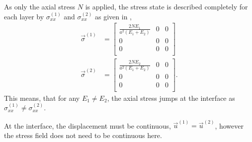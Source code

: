 \begin{derivation}
    As only the axial stress $N$ is applied, the stress state is described completely for each layer by $\sigma_{x x}^{(1)}$ and $\sigma_{x x}^{(2)}$ as given in ,
    \begin{align*}
      \Vec{\sigma}^{(1)} &= \begin{bmatrix}
        \frac{2NE_1}{a^2 \left( E_1 + E_2 \right)} & 0 & 0\\
      0 & 0 & 0\\
      0 & 0 & 0\\
      \end{bmatrix} \\
        \Vec{\sigma}^{(2)} &= \begin{bmatrix}
          \frac{2N E_2}{a^2 \left( E_1 + E_2 \right)} & 0 & 0\\
        0 & 0 & 0\\
        0 & 0 & 0\\
        \end{bmatrix}
    .\end{align*}
    This means, that for any $E_1 \neq E_2$, the axial stress jumps at the interface as $\sigma_{x x}^{(1)} \neq \sigma_{x x}^{(2)}$.

    At the interface, the displacement must be continuous, $\Vec{u}^{(1)} = \Vec{u}^{(2)}$, however the stress field does not need to be continuous here.
  \end{derivation}


